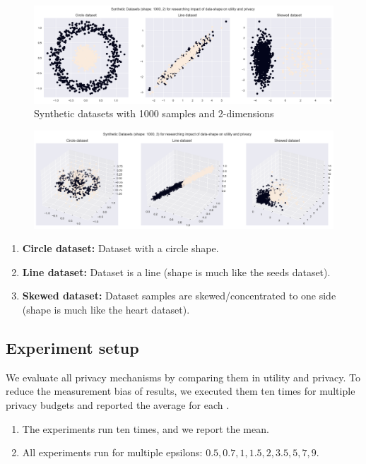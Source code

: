 \begin{figure}[H]
  \includegraphics[width=1.0\textwidth]{Method//images/2d-shapes.png}
  \caption{Synthetic datasets with 1000 samples and 2-dimensions}
  \label{rq3:synthetic-datasets}
\end{figure}
\begin{figure}[H]
  \includegraphics[width=1.0\textwidth]{3d-shapes.png}
  \label{rq3:synthetic-datasets-3d}
\end{figure}

\begin{enumerate}
  \item \textbf{Circle dataset:} Dataset with a circle shape.
  \item \textbf{Line dataset:} Dataset is a line (shape is much like the seeds dataset).
  \item \textbf{Skewed dataset:} Dataset samples are skewed/concentrated to one side (shape is much like the heart dataset).
\end{enumerate}

\subsection{Experiment setup}
We evaluate all privacy mechanisms by comparing them in utility and privacy.
To reduce the measurement bias of results, we executed them ten times for multiple privacy budgets and reported the average for each \citep{9679364}.
\begin{enumerate}
  \item The experiments run ten times, and we report the mean.
  \item All experiments run for multiple epsilons: ${0.5, 0.7, 1, 1.5, 2, 3.5, 5, 7, 9}$.
\end{enumerate}
\newpage

